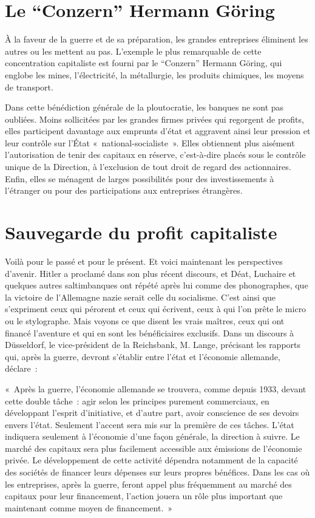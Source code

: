 \documentclass[french,twoside]{book} %
\newenvironment{quoteblock}%
  {\begin{quoting}}
  {\end{quoting}}
\newenvironment{quotebar}{%
    \def\FrameCommand{{\color{rubric!10!}\vrule width 0.5em} \hspace{0.9em}}%
    \def\OuterFrameSep{\itemsep} %
    \MakeFramed {\advance\hsize-\width \FrameRestore}
  }%
  {%
    \endMakeFramed
  }
\renewenvironment{quoteblock}%
  {%
    \savenotes
    \setstretch{0.9}
    \normalfont
    \begin{quotebar}
  }
  {%
    \end{quotebar}
    \spewnotes
  }
\begin{document}
\section[{Le “Conzern” Hermann Göring}]{Le “Conzern” Hermann Göring}
\noindent À la faveur de la guerre et de sa préparation, les grandes entreprises éliminent les autres ou les mettent au pas. L’exemple le plus remarquable de cette concentration capitaliste est fourni par le “Conzern” Hermann Göring, qui englobe les mines, l’électricité, la métallurgie, les produits chimiques, les moyens de transport.\par
Dans cette bénédiction générale de la ploutocratie, les banques ne sont pas oubliées. Moins sollicitées par les grandes firmes privées qui regorgent de profits, elles participent davantage aux emprunts d’état et aggravent ainsi leur pression et leur contrôle sur l’État « national-socialiste ». Elles obtiennent plus aisément l’autorisation de tenir des capitaux en réserve, c’est-à-dire placés sous le contrôle unique de la Direction, à l’exclusion de tout droit de regard des actionnaires. Enfin, elles se ménagent de larges possibilités pour des investissements à l’étranger ou pour des participations aux entreprises étrangères.
\section[{Sauvegarde du profit capitaliste}]{Sauvegarde du profit capitaliste}
\noindent Voilà pour le passé et pour le présent. Et voici maintenant les perspectives d’avenir. Hitler a proclamé dans son plus récent discours, et Déat, Luchaire et quelques autres saltimbanques ont répété après lui comme des phonographes, que la victoire de l’Allemagne nazie serait celle du socialisme. C’est ainsi que s’expriment ceux qui pérorent et ceux qui écrivent, ceux à qui l’on prête le micro ou le stylographe. Mais voyons ce que disent les vrais maîtres, ceux qui ont financé l’aventure et qui en sont les bénéficiaires exclusifs. Dans un discours à Düsseldorf, le vice-président de la Reichsbank, M. Lange, précisant les rapports qui, après la guerre, devront s’établir entre l’état et l’économie allemande, déclare :\par

\begin{quoteblock}
 \noindent « Après la guerre, l’économie allemande se trouvera, comme depuis 1933, devant cette double tâche : agir selon les principes purement commerciaux, en développant l’esprit d’initiative, et d’autre part, avoir conscience de ses devoirs envers l’état. Seulement l’accent sera mis sur la première de ces tâches. L’état indiquera seulement à l’économie d’une façon générale, la direction à suivre. Le marché des capitaux sera plus facilement accessible aux émissions de l’économie privée. Le développement de cette activité dépendra notamment de la capacité des sociétés de financer leurs dépenses sur leurs propres bénéfices. Dans les cas où les entreprises, après la guerre, feront appel plus fréquemment au marché des capitaux pour leur financement, l’action jouera un rôle plus important que maintenant comme moyen de financement. »
 \end{quoteblock}
\end{document}

